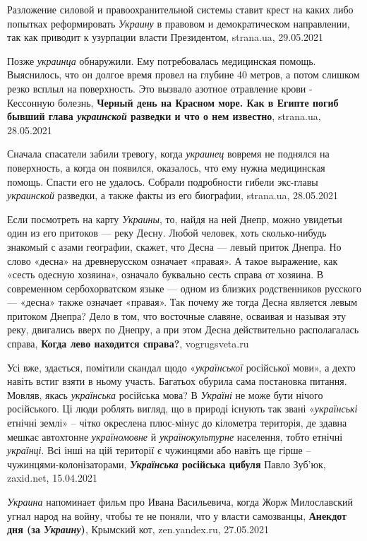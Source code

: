 Разложение силовой и правоохранительной системы ставит крест на каких либо
попытках реформировать \emph{Украину} в правовом и демократическом направлении, так
как приводит к узурпации власти Президентом, strana.ua, 29.05.2021

Позже \emph{украинца} обнаружили. Ему потребовалась медицинская помощь. Выяснилось,
что он долгое время провел на глубине 40 метров, а потом слишком резко всплыл
на поверхность. Это вызвало азотное отравление крови - Кессонную болезнь,
\textbf{Черный день на Красном море. Как в Египте погиб бывший глава
\emph{украинской} разведки и что о нем известно}, strana.ua, 28.05.2021

Сначала спасатели забили тревогу, когда \emph{украинец} вовремя не поднялся на
поверхность, а когда он появился, оказалось, что ему нужна медицинская помощь.
Спасти его не удалось.  Собрали подробности гибели экс-главы \emph{украинской}
разведки, а также факты из его биографии, strana.ua, 28.05.2021

Если посмотреть на карту \emph{Украины}, то, найдя на ней Днепр, можно увидетьи
один из его притоков — реку Десну.  Любой человек, хоть сколько-нибудь знакомый
с азами географии, скажет, что Десна — левый приток Днепра. Но слово «десна» на
древнерусском означает «правая». А такое выражение, как «сесть одесную
хозяина», означало буквально сесть справа от хозяина.  В современном
сербохорватском языке — одном из близких родственников русского — «десна» также
означает «правая». Так почему же тогда Десна является левым притоком Днепра?
Дело в том, что восточные славяне, осваивая и называя эту реку, двигались вверх
по Днепру, а при этом Десна действительно располагалась справа, \textbf{Когда
лево находится справа?}, vogrugsveta.ru

Усі вже, здається, помітили скандал щодо «\emph{української} російської мови»,
а дехто навіть встиг взяти в ньому участь. Багатьох обурила сама постановка
питання. Мовляв, якась \emph{українська} російська мова? В \emph{Україні} не
може бути нічого російського. Ці люди роблять вигляд, що в природі існують так
звані «\emph{українські} етнічні землі» – чітко окреслена плюс-мінус до
кілометра територія, де здавна мешкає автохтонне \emph{україномовне} й
\emph{українокультурне} населення, тобто етнічні \emph{українці}. Всі інші на
цій території є чужинцями або навіть ще гірше – чужинцями-колонізаторами,
\textbf{\emph{Українська} російська цибуля} Павло Зуб'юк, zaxid.net, 15.04.2021

\emph{Украина} напоминает фильм про Ивана Васильевича, когда Жорж Милославский
угнал народ на войну, чтобы те не поняли, что у власти самозванцы,
\textbf{Анекдот дня (за \emph{Украину})}, Крымский кот, zen.yandex.ru,
27.05.2021


